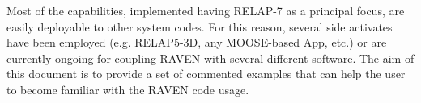 
%
Most of the capabilities, implemented having RELAP-7 as a principal focus, are
easily deployable to other system codes.
%
For this reason, several side activates have been employed (e.g.  RELAP5-3D, any MOOSE-based App, etc.)
or are currently ongoing for coupling RAVEN with several different software.
%
The aim of this document is to provide a set of commented examples that can help the user to become familiar 
with the RAVEN code usage.
